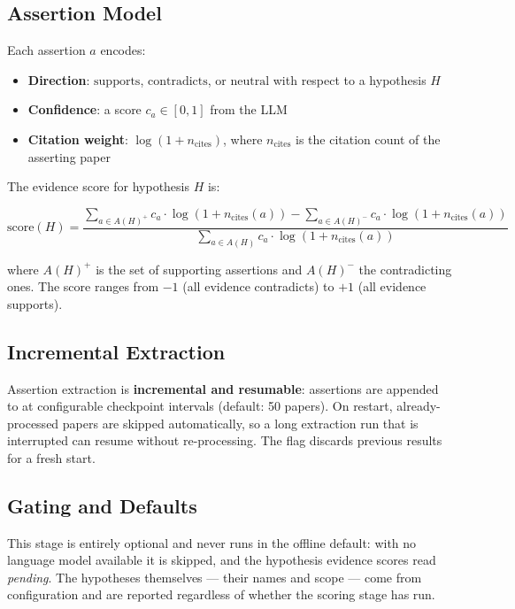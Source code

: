\documentclass[
  english,
]{article}
\providecommand{\tightlist}{%
  \setlength{\itemsep}{0pt}\setlength{\parskip}{0pt}}
\begin{document}
\subsection{Assertion Model}\label{assertion-model}

Each assertion \(a\) encodes:

\begin{itemize}
\tightlist
\item
  \textbf{Direction}: \(\text{supports}\), \(\text{contradicts}\), or
  \(\text{neutral}\) with respect to a hypothesis \(H\)
\item
  \textbf{Confidence}: a score \(c_a \in [0, 1]\) from the LLM
\item
  \textbf{Citation weight}: \(\log(1 + n_{\text{cites}})\), where
  \(n_{\text{cites}}\) is the citation count of the asserting paper
\end{itemize}

The evidence score for hypothesis \(H\) is:

\[
\text{score}(H) = \frac{\sum_{a \in A(H)^+} c_a \cdot \log(1 + n_{\text{cites}}(a)) -
\sum_{a \in A(H)^-} c_a \cdot \log(1 + n_{\text{cites}}(a))}
{\sum_{a \in A(H)} c_a \cdot \log(1 + n_{\text{cites}}(a))}
\]

where \(A(H)^+\) is the set of supporting assertions and \(A(H)^-\) the
contradicting ones. The score ranges from \(-1\) (all evidence
contradicts) to \(+1\) (all evidence supports).

\subsection{Incremental Extraction}\label{incremental-extraction}

Assertion extraction is \textbf{incremental and resumable}: assertions
are appended to  at configurable
checkpoint intervals (default: 50 papers). On restart, already-processed
papers are skipped automatically, so a long extraction run that is
interrupted can resume without re-processing. The
 flag discards previous results for a fresh
start.

\subsection{Gating and Defaults}\label{gating-and-defaults}

This stage is entirely optional and never runs in the offline default:
with no language model available it is skipped, and the hypothesis
evidence scores read \emph{pending}. The hypotheses themselves --- their
names and scope --- come from configuration and are reported regardless
of whether the scoring stage has run.
\end{document}
